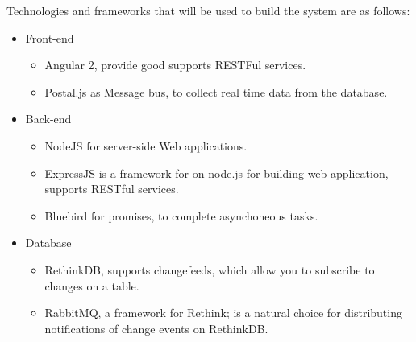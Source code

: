 Technologies and frameworks that will be used to build the system are as follows:
\begin{itemize}
\item Front-end
\begin{itemize}
	\item Angular 2, provide good supports RESTFul services.
	\item Postal.js as Message bus, to collect real time data from the database.
\end{itemize}
\item Back-end
\begin{itemize}
	\item NodeJS for server-side Web applications.
	\item ExpressJS is a framework for on node.js for building web-application, supports RESTful services.
	\item Bluebird for promises, to complete asynchoneous tasks.
\end{itemize}
\item Database
\begin{itemize}
	\item RethinkDB, supports changefeeds, which allow you to subscribe to changes on a table.
	\item RabbitMQ, a framework for Rethink; is a natural choice for distributing notifications of change events on RethinkDB.
\end{itemize}

\end{itemize}
